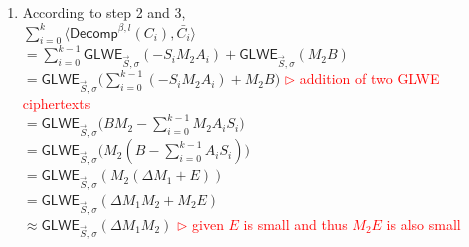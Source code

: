 \begin{myproof}
\begin{enumerate}
$ $
Therefore: \\
$\langle \textsf{Decomp}^{\beta, l}(A_0), \bar{C_0} \rangle + \langle \textsf{Decomp}^{\beta, l}(A_1), \bar{C_1} \rangle + \gap{$\cdots$} + \langle \textsf{Decomp}^{\beta, l}(A_{k-1}), \bar{C}_{k-1} \rangle$ \\
$= \sum\limits_{i=0}^{k-1}\langle \textsf{Decomp}^{\beta, l}(A_i), \bar{C_i} \rangle$ \\
$= \sum\limits_{i=0}^{k-1}\left(A_{\langle i, 1\rangle} \cdot \textsf{GLWE}_{\vec{S}, \sigma}\left(-S_iM_2\dfrac{q}{\beta^1}\right) + A_{\langle i, 2\rangle} \cdot \textsf{GLWE}_{\vec{S}, \sigma}\left(-S_iM_2\dfrac{q}{\beta^2}\right) + \gap{$\cdots$} + A_{\langle i, l\rangle} \cdot \textsf{GLWE}_{\vec{S}, \sigma}\left(-S_iM_2\dfrac{q}{\beta^l}\right)\right)$ \\
$= \sum\limits_{i=0}^{k-1}\left(\textsf{GLWE}_{\vec{S}, \sigma}\left(-A_{\langle i, 1\rangle}S_iM_2\dfrac{q}{\beta^1}\right) + \textsf{GLWE}_{\vec{S}, \sigma}\left(-A_{\langle i, 2\rangle}S_iM_2\dfrac{q}{\beta^2}\right) + \gap{$\cdots$} + \textsf{GLWE}_{\vec{S}, \sigma}\left(-A_{\langle i, l\rangle}S_iM_2\dfrac{q}{\beta^l}\right)\right)$ \\
$= \sum\limits_{i=0}^{k-1}\textsf{GLWE}_{\vec{S}, \sigma}\left(-A_{\langle i, 1\rangle}S_iM_2\dfrac{q}{\beta^1} + -A_{\langle i, 2\rangle}S_iM_2\dfrac{q}{\beta^2} + \gap{$\cdots$} + -A_{\langle i, l\rangle}S_iM_2\dfrac{q}{\beta^l}\right)$ \\
$= \sum\limits_{i=0}^{k-1}\textsf{GLWE}_{\vec{S}, \sigma}\left(-S_iM_2 \cdot \left(A_{\langle i, 1\rangle}\dfrac{q}{\beta^1} + A_{\langle i, 2\rangle}\dfrac{q}{\beta^2} + \gap{$\cdots$} + A_{\langle i, l\rangle}\dfrac{q}{\beta^l}\right)\right)$ \\
$= \sum\limits_{i=0}^{k-1}\textsf{GLWE}_{\vec{S}, \sigma}(-S_iM_2A_i)$
\item According to step 2 and 3, \\
$\sum\limits_{i=0}^{k}\langle \textsf{Decomp}^{\beta, l}(C_i), \bar{C_i} \rangle$ \\
$= \sum\limits_{i=0}^{k-1}\textsf{GLWE}_{\vec{S}, \sigma}(-S_iM_2A_i) + \textsf{GLWE}_{\vec{S}, \sigma} (M_{2}B)$ \\ 
$= \textsf{GLWE}_{\vec{S}, \sigma}\Big(\sum\limits_{i=0}^{k-1}(-S_iM_2A_i) + M_{2}B\Big)$ \textcolor{red}{ $\rhd$ addition of two GLWE ciphertexts} \\ 
$= \textsf{GLWE}_{\vec{S}, \sigma}\Big(BM_2 - \sum\limits_{i=0}^{k-1}M_2A_iS_i\Big)$  \\ 
$= \textsf{GLWE}_{\vec{S}, \sigma}\Big(M_2(B - \sum\limits_{i=0}^{k-1}A_iS_i)\Big)$\\
$= \textsf{GLWE}_{\vec{S}, \sigma}(M_2(\Delta M_1 + E))$ \\
$= \textsf{GLWE}_{\vec{S}, \sigma}(\Delta M_1M_2 + M_2E)$ \\
$\approx \textsf{GLWE}_{\vec{S}, \sigma}(\Delta M_1M_2)$ \textcolor{red}{ $\rhd$ given $E$ is small and thus $M_2E$ is also small}
\end{enumerate}

\end{myproof}

